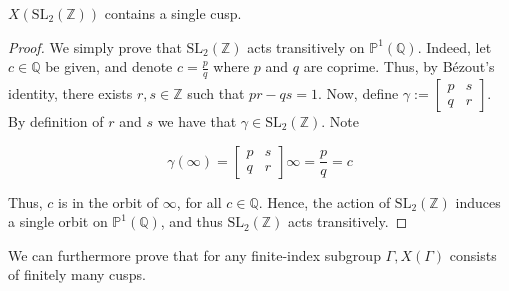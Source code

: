 \begin{proposition}\label{2.7.4}
    $X\left(\mathrm{SL}_{2}(\mathbb{Z})\right)$ contains a single cusp.
\begin{proof}
     We simply prove that $\mathrm{SL}_{2}(\mathbb{Z})$ acts transitively on $\mathbb{P}^{1}(\mathbb{Q})$. Indeed, let $c \in \mathbb{Q}$ be given, and denote $c=\frac{p}{q}$ where $p$ and $q$ are coprime. Thus, by Bézout's identity, there exists $r, s \in \mathbb{Z}$ such that $p r-q s=1$. Now, define $\gamma:=\left[\begin{array}{ll}p & s \\ q & r\end{array}\right]$. By definition of $r$ and $s$ we have that $\gamma \in \mathrm{SL}_{2}(\mathbb{Z})$. Note

$$
\gamma(\infty)=\left[\begin{array}{ll}
p & s \\
q & r
\end{array}\right] \infty=\frac{p}{q}=c
$$

Thus, $c$ is in the orbit of $\infty$, for all $c \in \mathbb{Q}$. Hence, the action of $\mathrm{SL}_{2}(\mathbb{Z})$ induces a single orbit on $\mathbb{P}^{1}(\mathbb{Q})$, and thus $\mathrm{SL}_{2}(\mathbb{Z})$ acts transitively.

\end{proof}
\end{proposition}
We can furthermore prove that for any finite-index subgroup $\Gamma, X(\Gamma)$ consists of finitely many cusps.
